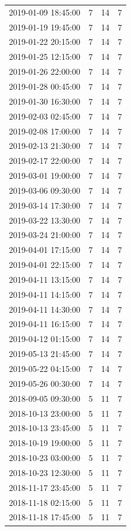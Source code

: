 \begin{tabular}{lrrr}
2019-01-09 18:45:00 & 7 & 14 & 7 \\
2019-01-19 19:45:00 & 7 & 14 & 7 \\
2019-01-22 20:15:00 & 7 & 14 & 7 \\
2019-01-25 12:15:00 & 7 & 14 & 7 \\
2019-01-26 22:00:00 & 7 & 14 & 7 \\
2019-01-28 00:45:00 & 7 & 14 & 7 \\
2019-01-30 16:30:00 & 7 & 14 & 7 \\
2019-02-03 02:45:00 & 7 & 14 & 7 \\
2019-02-08 17:00:00 & 7 & 14 & 7 \\
2019-02-13 21:30:00 & 7 & 14 & 7 \\
2019-02-17 22:00:00 & 7 & 14 & 7 \\
2019-03-01 19:00:00 & 7 & 14 & 7 \\
2019-03-06 09:30:00 & 7 & 14 & 7 \\
2019-03-14 17:30:00 & 7 & 14 & 7 \\
2019-03-22 13:30:00 & 7 & 14 & 7 \\
2019-03-24 21:00:00 & 7 & 14 & 7 \\
2019-04-01 17:15:00 & 7 & 14 & 7 \\
2019-04-01 22:15:00 & 7 & 14 & 7 \\
2019-04-11 13:15:00 & 7 & 14 & 7 \\
2019-04-11 14:15:00 & 7 & 14 & 7 \\
2019-04-11 14:30:00 & 7 & 14 & 7 \\
2019-04-11 16:15:00 & 7 & 14 & 7 \\
2019-04-12 01:15:00 & 7 & 14 & 7 \\
2019-05-13 21:45:00 & 7 & 14 & 7 \\
2019-05-22 04:15:00 & 7 & 14 & 7 \\
2019-05-26 00:30:00 & 7 & 14 & 7 \\
2018-09-05 09:30:00 & 5 & 11 & 7 \\
2018-10-13 23:00:00 & 5 & 11 & 7 \\
2018-10-13 23:45:00 & 5 & 11 & 7 \\
2018-10-19 19:00:00 & 5 & 11 & 7 \\
2018-10-23 03:00:00 & 5 & 11 & 7 \\
2018-10-23 12:30:00 & 5 & 11 & 7 \\
2018-11-17 23:45:00 & 5 & 11 & 7 \\
2018-11-18 02:15:00 & 5 & 11 & 7 \\
2018-11-18 17:45:00 & 5 & 11 & 7 \\

\end{tabular}
